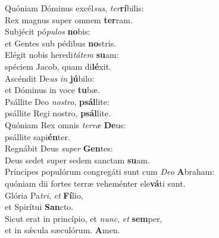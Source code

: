 \evenverse Quóniam Dóminus excél\textit{sus}, \textit{ter}\textbf{rí}bilis:~\*\\
\evenverse Rex magnus super omnem \textbf{ter}ram.\\
\oddverse Subjécit pó\textit{pu}\textit{los} \textbf{no}bis:~\*\\
\oddverse et Gentes sub pédibus \textbf{no}stris.\\
\evenverse Elégit nobis heredi\textit{tá}\textit{tem} \textbf{su}am:~\*\\
\evenverse spéciem Jacob, quam di\textbf{lé}xit.\\
\oddverse Ascéndit De\textit{us} \textit{in} \textbf{jú}bilo:~\*\\
\oddverse et Dóminus in voce \textbf{tu}bæ.\\
\evenverse Psállite Deo \textit{no}\textit{stro}, \textbf{psál}lite:~\*\\
\evenverse psállite Regi nostro, \textbf{psál}lite.\\
\oddverse Quóniam Rex omnis \textit{ter}\textit{ræ} \textbf{De}us:~\*\\
\oddverse psállite sapi\textbf{én}ter.\\
\evenverse Regnábit Deus \textit{su}\textit{per} \textbf{Gen}tes:~\*\\
\evenverse Deus sedet super sedem sanctam \textbf{su}am.\\
\oddverse Príncipes populórum congregáti sunt cum \textit{De}\textit{o} \textbf{A}braham:~\*\\
\oddverse quóniam dii fortes terræ veheménter ele\textbf{vá}ti sunt.\\
\evenverse Glória Pa\textit{tri}, \textit{et} \textbf{Fí}lio,~\*\\
\evenverse et Spirítui \textbf{San}cto.\\
\oddverse Sicut erat in princípio, et \textit{nunc}, \textit{et} \textbf{sem}per,~\*\\
\oddverse et in sǽcula sæculórum. \textbf{A}men.\\
